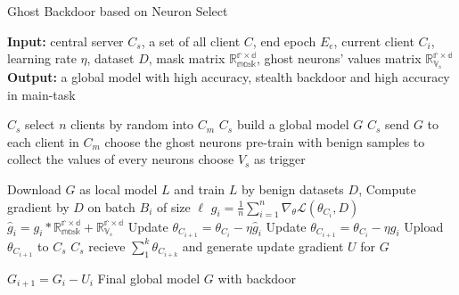 \documentclass{article}
\begin{document}
\begin{algorithm}[t]
	\caption{Ghost Backdoor based on Neuron Select} %
	\hspace*{0.02in} {\bf Input:} %
	{central server $C_s$, a set of all client $C$, end epoch $E_e$,
    current client $C_i$, learning rate $\eta$, dataset $D$, 
    mask matrix $\mathbb{R_{mask}^{r\times d}}$,
    ghost neurons' values matrix $\mathbb{R_{V_s}^{r\times d}}$}\\
	\hspace*{0.02in} {\bf Output:} %
	a global model with high accuracy, stealth backdoor and high accuracy in main-task


	\begin{algorithmic}[1]

	\State $C_s$ select $n$ clients by random into $C_m$ %
	\State $C_s$ build a global model $G$
	\State $C_s$ send $G$ to each client in $C_m$
    \State choose the ghost neurons 
    \State pre-train with benign samples to collect the values of every neurons
    \State choose $V_s$ as trigger
			
			\State Download $G$ as local model $L$ and train $L$ by benign datasets $D$, 
			\State Compute gradient by $D$ on batch $B_i$ of size $\ell$
			\State $ g_i = \frac{1}{n}\sum_{i = 1}^{n}\nabla_\theta \mathcal{L}(\theta_{C_i}, D) $
                \State $ \hat{g}_i = g_i * \mathbb{R_{mask}^{r\times d}} + \mathbb{R_{V_s}^{r\times d}}$
                \State Update $ \theta_{C_{i+1}} = \theta_{C_i} - \eta \hat{g}_i $
            \Else
			\State Update $ \theta_{C_{i+1}} = \theta_{C_i} - \eta g_i $
            \EndIf
            \State Upload $ \theta_{C_{i+1}}$ to $C_s $
			\State $C_s$ recieve $ \sum_1^k \theta_{C_{i+k}}$ and generate update gradient $U$ for $G$

			\EndFor
		\EndFor

	\State $G_{i+1} = G_i - U_i$
	\EndFor
\State \Return Final global model $G$ with backdoor

	\end{algorithmic}
	

\end{algorithm}
\end{document}
